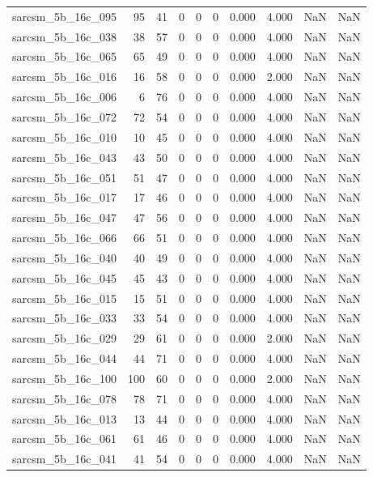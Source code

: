 \documentclass{article}
\begin{document}
\begin{longtable}{lrrrrrrrrr}
sarcsm\_5b\_16c\_095 & 95 & 41 & 0 & 0 & 0 & 0.000 & 4.000 & NaN & NaN \\
sarcsm\_5b\_16c\_038 & 38 & 57 & 0 & 0 & 0 & 0.000 & 4.000 & NaN & NaN \\
sarcsm\_5b\_16c\_065 & 65 & 49 & 0 & 0 & 0 & 0.000 & 4.000 & NaN & NaN \\
sarcsm\_5b\_16c\_016 & 16 & 58 & 0 & 0 & 0 & 0.000 & 2.000 & NaN & NaN \\
sarcsm\_5b\_16c\_006 & 6 & 76 & 0 & 0 & 0 & 0.000 & 4.000 & NaN & NaN \\
sarcsm\_5b\_16c\_072 & 72 & 54 & 0 & 0 & 0 & 0.000 & 4.000 & NaN & NaN \\
sarcsm\_5b\_16c\_010 & 10 & 45 & 0 & 0 & 0 & 0.000 & 4.000 & NaN & NaN \\
sarcsm\_5b\_16c\_043 & 43 & 50 & 0 & 0 & 0 & 0.000 & 4.000 & NaN & NaN \\
sarcsm\_5b\_16c\_051 & 51 & 47 & 0 & 0 & 0 & 0.000 & 4.000 & NaN & NaN \\
sarcsm\_5b\_16c\_017 & 17 & 46 & 0 & 0 & 0 & 0.000 & 4.000 & NaN & NaN \\
sarcsm\_5b\_16c\_047 & 47 & 56 & 0 & 0 & 0 & 0.000 & 4.000 & NaN & NaN \\
sarcsm\_5b\_16c\_066 & 66 & 51 & 0 & 0 & 0 & 0.000 & 4.000 & NaN & NaN \\
sarcsm\_5b\_16c\_040 & 40 & 49 & 0 & 0 & 0 & 0.000 & 4.000 & NaN & NaN \\
sarcsm\_5b\_16c\_045 & 45 & 43 & 0 & 0 & 0 & 0.000 & 4.000 & NaN & NaN \\
sarcsm\_5b\_16c\_015 & 15 & 51 & 0 & 0 & 0 & 0.000 & 4.000 & NaN & NaN \\
sarcsm\_5b\_16c\_033 & 33 & 54 & 0 & 0 & 0 & 0.000 & 4.000 & NaN & NaN \\
sarcsm\_5b\_16c\_029 & 29 & 61 & 0 & 0 & 0 & 0.000 & 2.000 & NaN & NaN \\
sarcsm\_5b\_16c\_044 & 44 & 71 & 0 & 0 & 0 & 0.000 & 4.000 & NaN & NaN \\
sarcsm\_5b\_16c\_100 & 100 & 60 & 0 & 0 & 0 & 0.000 & 2.000 & NaN & NaN \\
sarcsm\_5b\_16c\_078 & 78 & 71 & 0 & 0 & 0 & 0.000 & 4.000 & NaN & NaN \\
sarcsm\_5b\_16c\_013 & 13 & 44 & 0 & 0 & 0 & 0.000 & 4.000 & NaN & NaN \\
sarcsm\_5b\_16c\_061 & 61 & 46 & 0 & 0 & 0 & 0.000 & 4.000 & NaN & NaN \\
sarcsm\_5b\_16c\_041 & 41 & 54 & 0 & 0 & 0 & 0.000 & 4.000 & NaN & NaN \\

\end{longtable}
\end{document}
